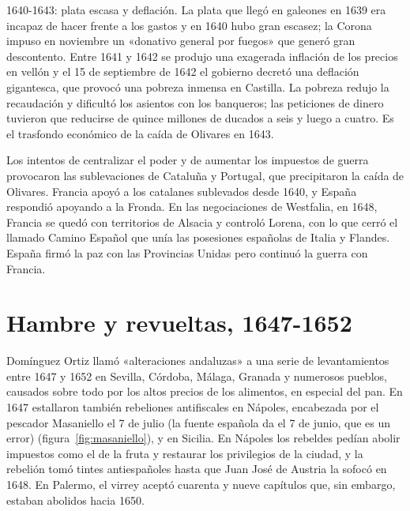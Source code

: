 \documentclass{book}
\begin{document}

1640-1643: plata escasa y deflación. La plata que llegó en galeones en 1639 era incapaz de hacer frente a los gastos y en 1640 hubo gran escasez; la Corona impuso en noviembre un «donativo general por fuegos» que generó gran descontento. Entre 1641 y 1642 se produjo una exagerada inflación de los precios en vellón y el 15 de septiembre de 1642 el gobierno decretó una deflación gigantesca, que provocó una pobreza inmensa en Castilla. La pobreza redujo la recaudación y dificultó los asientos con los banqueros; las peticiones de dinero tuvieron que reducirse de quince millones de ducados a seis y luego a cuatro. Es el trasfondo económico de la caída de Olivares en 1643.


Los intentos de centralizar el poder y de aumentar los impuestos de guerra provocaron las sublevaciones de Cataluña y Portugal, que precipitaron la caída de Olivares. Francia apoyó a los catalanes sublevados desde 1640, y España respondió apoyando a la Fronda. En las negociaciones de Westfalia, en 1648, Francia se quedó con territorios de Alsacia y controló Lorena, con lo que cerró el llamado Camino Español que unía las posesiones españolas de Italia y Flandes. España firmó la paz con las Provincias Unidas pero continuó la guerra con Francia.


\section{Hambre y revueltas, 1647-1652}

Domínguez Ortiz llamó «alteraciones andaluzas» a una serie de levantamientos entre 1647 y 1652 en Sevilla, Córdoba, Málaga, Granada y numerosos pueblos, causados sobre todo por los altos precios de los alimentos, en especial del pan. En 1647 estallaron también rebeliones antifiscales en Nápoles, encabezada por el pescador Masaniello el 7 de julio (la fuente española da el 7 de junio, que es un error) (figura~\ref{fig:masaniello}), y en Sicilia. En Nápoles los rebeldes pedían abolir impuestos como el de la fruta y restaurar los privilegios de la ciudad, y la rebelión tomó tintes antiespañoles hasta que Juan José de Austria la sofocó en 1648. En Palermo, el virrey aceptó cuarenta y nueve capítulos que, sin embargo, estaban abolidos hacia 1650.
\end{document}
